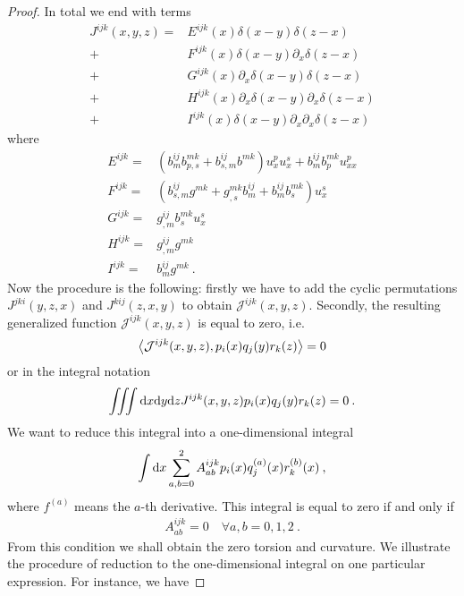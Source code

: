 \begin{proof}
    In total we end with terms
    \begin{align}
        J^{ijk}(x,y,z) =& 
        E^{ijk}(x) \delta(x-y) \delta(z-x) 
        \\+& F^{ijk}(x) \delta(x-y) \partial_x \delta(z-x) 
        \\+& G^{ijk}(x) \partial_x \delta(x-y) \delta (z-x) 
        \\+& H^{ijk}(x) \partial_x \delta(x-y) \partial_x \delta (z-x) 
        \\+& I^{ijk}(x) \delta(x-y) \partial_x \partial_x \delta (z-x)
    \end{align}
    where
    \begin{align}
        E^{ijk} =& (b^{ij}_m b^{mk}_{p,s} + b^{ij}_{s,m} b^{mk} ) u^p_x u^s_x + b^{ij}_m b^{mk}_p u^p_{xx} \\
        F^{ijk} =& (b^{ij}_{s,m} g^{mk} + g^{mk}_{,s} b^{ij}_m + b^{ij}_m b^{mk}_s)u_x^s \\
        G^{ijk} =& g^{ij}_{,m} b^{mk}_s u^s_x \\
        H^{ijk} =& g^{ij}_{,m} g^{mk} \\
        I^{ijk} =& b^{ij}_m g^{mk} \:.
    \end{align}
    Now the procedure is the following: firstly we have to add the cyclic permutations $J^{jki}(y,z,x)$ and $J^{kij}(z,x,y)$ to obtain $\mathcal J^{ijk}(x,y,z)$. Secondly, the resulting generalized function $\mathcal J^{ijk}(x,y,z)$ is equal to zero, i.e.
    \begin{align}
        \left \langle \mathcal J^{ijk}(x,y,z) ,p_i(x)q_j(y)r_k(z) \right \rangle = 0
    \end{align}
    or in the integral notation 
    \begin{align}
        \iiint \mathrm{d} x \mathrm{d} y \mathrm{d} z J^{ijk}(x,y,z) p_i(x)q_j(y)r_k(z) = 0 \:.
    \end{align}
    We want to reduce this integral into a one-dimensional integral
    \begin{align}
        \int \mathrm{d} x \sum_{a,b = 0}^2 A^{ijk}_{ab} p_i(x) q^{(a)}_j(x) r^{(b)}_k (x) \:,
    \end{align}
    where $f^{(a)}$ means the $a$-th derivative. This integral is equal to zero if and only if
    \begin{align}
        A^{ijk}_{ab} = 0 \quad \forall a,b = 0,1,2 \:.
    \end{align}
    From this condition we shall obtain the zero torsion and curvature.
    We illustrate the procedure of reduction to the one-dimensional integral on one particular expression. For instance, we have

\end{proof}
